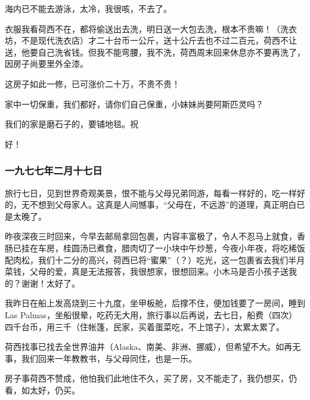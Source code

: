 \par 海内已不能去游泳，太冷，我很咳，不去了。
\par 衣服我看荷西不在，都将偷送出去洗，明日送一大包去洗，根本不贵嘛！（洗衣坊，不是现代洗衣店）才二十台币一公斤，送十公斤去也不过二百元，荷西不让送，他要自己洗省钱。但我不能弯腰，我不洗，荷西周末回来休息亦不要再洗了，因房子尚要里外全漆。
\par 这房子如此一修，已可涨价二十万，不贵不贵！
\par 家中一切保重，我们都好，请你们自己保重，小妹妹尚要阿斯匹灵吗？
\par 我们的家是磨石子的，要铺地毯。祝
\par 好！
\par {}



\subsubsection{一九七七年二月十七日}


\par {}
\par 旅行七日，见到世界奇观美景，恨不能与父母兄弟同游，每看一样好的，吃一样好的，无不想到父母家人。这真是人间憾事，“父母在，不远游”的道理，真正明白已是太晚了。
\par 昨夜深夜三时回来，今早去邮局拿回包裹，内容丰富极了，令人不忍马上就食，香肠已挂在车房，桂圆汤已煮食，腊肉切了一小块中午炒葱，今夜小年夜，将吃稀饭配肉松，我们十二分的高兴，荷西已将“蜜果”（？）吃光，这一包裹省去我们半月菜钱，父母的爱，真是无法报答，我很想家，很想回来。小木马是否小孩子送我的？谢谢！太好了。
\par 我昨日在船上发高烧到三十九度，坐甲板舱，后撑不住，便加钱要了一房间，睡到Las Palmas，坐船很晕，吃药无大用，旅行事以后再说，去七日，船费（四次）四千台币，用三千（住帐篷，民家，买着蛋菜吃，不上馆子），太累太累了。
\par 荷西找事已找去全世界油井（Alaska、南美、非洲、挪威），但希望不大。如再无事，我们回来一年教教书，与父母同住，也是一乐。
\par 房子事荷西不赞成，他怕我们此地住不久，买了房，又不能走了，我仍想买，仍看，如太好，仍买。


